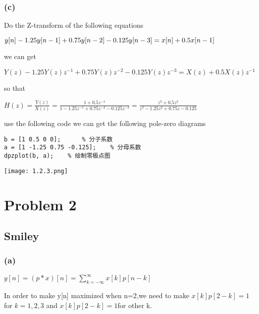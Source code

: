 \documentclass{article}
\begin{document}
\subsubsection*{(c)}
Do the Z-transform of the following equations
\begin{center}
    \begin{math}
        \centering
        y[n] - 1.25y[n-1] +0.75y[n-2]-0.125y[n-3] = x[n] +0.5x[n-1]
    \end{math}
\end{center}
we can get
\begin{center}
    \begin{math}
        Y(z) - 1.25Y(z)z^{-1} + 0.75Y(z)z^{-2} - 0.125Y(z)z^{-3} = X(z) + 0.5X(z)z^{-1}
    \end{math}
\end{center}
so that
\begin{center}
    \begin{math}
        H(z) = \frac{Y(z)}{X(z)} = \frac{1+0.5z^{-1}}{1-1.25z^{-1}+0.75z^{-2}-0.125z^{-3}} = \frac{z^3+0.5z^2}{z^3-1.25z^2+0.75z-0.125}
    \end{math}
\end{center}
use the following code we can get the following pole-zero diagrams
\begin{lstlisting}
b = [1 0.5 0 0];      % 分子系数
a = [1 -1.25 0.75 -0.125];    % 分母系数
dpzplot(b, a);    % 绘制零极点图
\end{lstlisting}
\begin{center}
    \texttt{[image: 1.2.3.png]}
\end{center}

\section{Problem 2}
\subsection{Smiley}
\subsubsection*{(a)}
\begin{center}
    \begin{math}
        y[n] = (p*x)[n] = \sum_{k=-\infty}^{\infty}x[k]p[n-k]
    \end{math}
\end{center}
In order to make y[n] maximized when n=2,we need to make $x[k]p[2-k] = 1$for $k = 1,2,3$
and $x[k]p[2-k] = 1$for other k.
\end{document}
